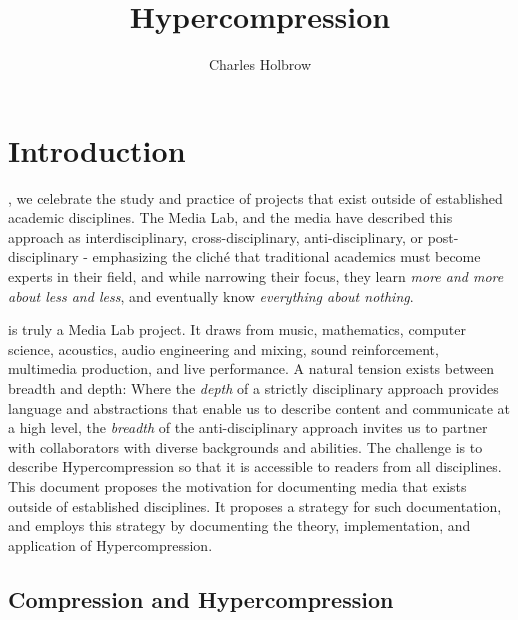 \documentclass{tufte-book}
\title{Hypercompression}
\author{Charles Holbrow}
\newcommand{\thesis}{Hypercompression\xspace}
\begin{document}
\frontmatter

\maketitle

\tableofcontents

\mainmatter

\cleardoublepage
\chapter{Introduction}
\label{ch:introduction}

\begin{fullwidth}
  , we celebrate the study and practice
  of projects that exist outside of established academic
  disciplines. The Media Lab, and the media have described this
  approach as interdisciplinary, cross-disciplinary,
  anti-disciplinary, or post-disciplinary - emphasizing the clich\'{e}
  that traditional academics must become experts in their field,
  and while narrowing their focus, they learn \textit{more and more
    about less and less}, and eventually know \textit{everything about
    nothing}.
\end{fullwidth}

\newthought{\thesis} is truly a Media Lab project. It draws from
music, mathematics, computer science, acoustics, audio engineering and
mixing, sound reinforcement, multimedia production, and live
performance. A natural tension exists between breadth and depth: Where
the \textit{depth} of a strictly disciplinary approach provides
language and abstractions that enable us to describe content and
communicate at a high level, the \textit{breadth} of the anti-disciplinary
approach invites us to partner with collaborators with diverse
backgrounds and abilities. The challenge is to describe \thesis so
that it is accessible to readers from all disciplines. This document
proposes the motivation for documenting media that exists outside of
established disciplines. It proposes a strategy for such
documentation, and employs this strategy by documenting the theory,
implementation, and application of \thesis.



\section{Compression and Hypercompression}
\label{sec:compression-and-hypercompression}
\end{document}
